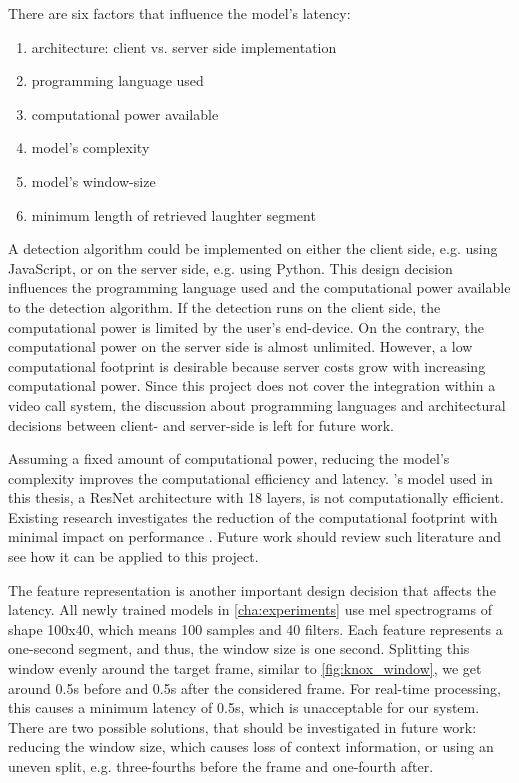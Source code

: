 \documentclass[bsc,frontabs,parskip,deptreport]{infthesis}
\begin{document}
There are six factors that influence the model's latency:
\begin{enumerate}
    \item architecture: client vs. server side implementation
    \item programming language used
    \item computational power available
    \item model's complexity
    \item model's window-size
    \item minimum length of retrieved laughter segment
\end{enumerate}


A detection algorithm could be implemented on either the client side, e.g. using JavaScript, or on the server side, e.g. using Python. 
This design decision influences the programming language used and the computational power available to the detection algorithm. If the detection runs on the client side, the computational power is limited by the user's end-device. On the contrary, the computational power on the server side is almost unlimited. However, a low computational footprint is desirable because server costs grow with increasing computational power.
Since this project does not cover the integration within a video call system, the discussion about programming languages and architectural decisions between client- and server-side is left for future work.

Assuming a fixed amount of computational power, reducing the model's complexity improves the computational efficiency and latency.
\citeauthor{gillick2021robust}'s \citeyearpar{gillick2021robust} model used in this thesis, a ResNet architecture with 18 layers, is not computationally efficient. Existing research investigates the reduction of the computational footprint with minimal impact on performance \citep{meyer2017efficient, sorensen2020depthwise}. Future work should review such literature and see how it can be applied to this project. 

The feature representation is another important design decision that affects the latency.
All newly trained models in \autoref{cha:experiments} use mel spectrograms of shape 100x40, which means 100 samples and 40 filters. 
Each feature represents a one-second segment, and thus, the window size is one second.
Splitting this window evenly around the target frame, similar to \autoref{fig:knox_window}, we get around 0.5s before and 0.5s after the considered frame. For real-time processing, this causes a minimum latency of 0.5s, which is unacceptable for our system.
There are two possible solutions, that should be investigated in future work: reducing the window size, which causes loss of context information, or using an uneven split, e.g. three-fourths before the frame and one-fourth after. 
\end{document}
